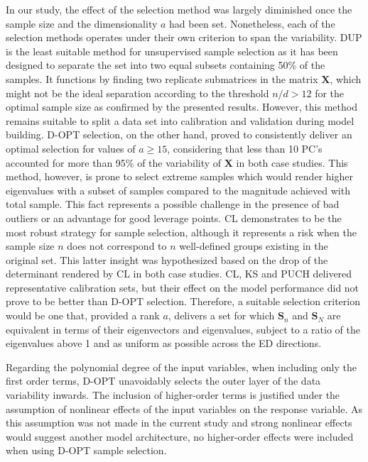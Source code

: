 \documentclass[journal=ancham,manuscript=article]{achemso}
\begin{document}
In our study, the effect of the selection method was largely diminished once the sample size and the dimensionality $a$ had been set. Nonetheless, each of the selection methods operates under their own criterion to span the variability. DUP is the least suitable method for unsupervised sample selection as it has been designed to separate the set into two equal subsets containing 50\% of the samples. It functions by finding two replicate submatrices in the matrix $\mathbf{X}$, which might not be the ideal separation according to the threshold $n/d>12$ for the optimal sample size as confirmed by the presented results. However, this method remains suitable to split a data set into calibration and validation during model building\cite{Aernouts2011}. D-OPT selection, on the other hand, proved to consistently deliver an optimal selection for values of $a \ge 15$, considering that less than 10 PC's accounted for more than 95\% of the variability of $\mathbf{X}$ in both case studies. This method, however, is prone to select extreme samples which would render higher eigenvalues with a subset of samples compared to the magnitude achieved with total sample. This fact represents a possible challenge in the presence of bad outliers or an advantage for good leverage points. CL demonstrates to be the most robust strategy for sample selection, although it represents a risk when the sample size $n$ does not correspond to $n$ well-defined groups existing in the original set. This latter insight was hypothesized based on the drop of the determinant rendered by CL in both case studies. CL, KS and PUCH delivered representative calibration sets, but their effect on the model performance did not prove to be better than D-OPT selection. Therefore, a suitable selection criterion would be one that, provided a rank $a$, delivers a set for which $\mathbf{S}_n$ and $\mathbf{S}_N$ are equivalent in terms of their eigenvectors and eigenvalues, subject to a ratio of the eigenvalues above 1 and as uniform as possible across the ED directions.

Regarding the polynomial degree of the input variables, when including only the first order terms, D-OPT unavoidably selects the outer layer of the data variability inwards. The inclusion of higher-order terms is justified under the assumption of nonlinear effects of the input variables on the response variable. As this assumption was not made in the current study and strong nonlinear effects would suggest another model architecture, no higher-order effects were included when using D-OPT sample selection.
\end{document}

